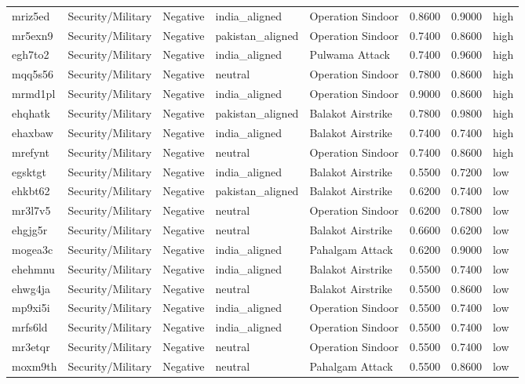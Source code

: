 \begin{longtable}{lllllrrl}
mriz5ed & Security/Military & Negative & india\_aligned & Operation Sindoor & 0.8600 & 0.9000 & high \\
mr5exn9 & Security/Military & Negative & pakistan\_aligned & Operation Sindoor & 0.7400 & 0.8600 & high \\
egh7to2 & Security/Military & Negative & india\_aligned & Pulwama Attack & 0.7400 & 0.9600 & high \\
mqq5s56 & Security/Military & Negative & neutral & Operation Sindoor & 0.7800 & 0.8600 & high \\
mrmd1pl & Security/Military & Negative & india\_aligned & Operation Sindoor & 0.9000 & 0.8600 & high \\
ehqhatk & Security/Military & Negative & pakistan\_aligned & Balakot Airstrike & 0.7800 & 0.9800 & high \\
ehaxbaw & Security/Military & Negative & india\_aligned & Balakot Airstrike & 0.7400 & 0.7400 & high \\
mrefynt & Security/Military & Negative & neutral & Operation Sindoor & 0.7400 & 0.8600 & high \\
egsktgt & Security/Military & Negative & india\_aligned & Balakot Airstrike & 0.5500 & 0.7200 & low \\
ehkbt62 & Security/Military & Negative & pakistan\_aligned & Balakot Airstrike & 0.6200 & 0.7400 & low \\
mr3l7v5 & Security/Military & Negative & neutral & Operation Sindoor & 0.6200 & 0.7800 & low \\
ehgjg5r & Security/Military & Negative & neutral & Balakot Airstrike & 0.6600 & 0.6200 & low \\
mogea3c & Security/Military & Negative & india\_aligned & Pahalgam Attack & 0.6200 & 0.9000 & low \\
ehehmnu & Security/Military & Negative & india\_aligned & Balakot Airstrike & 0.5500 & 0.7400 & low \\
ehwg4ja & Security/Military & Negative & neutral & Balakot Airstrike & 0.5500 & 0.8600 & low \\
mp9xi5i & Security/Military & Negative & india\_aligned & Operation Sindoor & 0.5500 & 0.7400 & low \\
mrfs6ld & Security/Military & Negative & india\_aligned & Operation Sindoor & 0.5500 & 0.7400 & low \\
mr3etqr & Security/Military & Negative & neutral & Operation Sindoor & 0.5500 & 0.7400 & low \\
moxm9th & Security/Military & Negative & neutral & Pahalgam Attack & 0.5500 & 0.8600 & low \\

\end{longtable}
